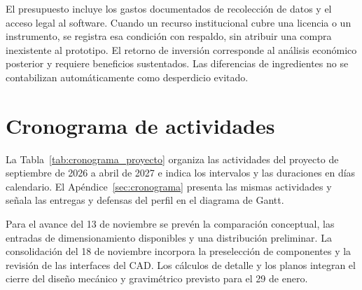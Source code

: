 El presupuesto incluye los gastos documentados de recolección de datos
y el acceso legal al software. Cuando un recurso institucional cubre una
licencia o un instrumento, se registra esa condición con respaldo, sin
atribuir una compra inexistente al prototipo. El retorno de inversión
corresponde al análisis económico posterior y requiere beneficios
sustentados. Las diferencias de ingredientes no se contabilizan
automáticamente como desperdicio evitado.

\section{Cronograma de actividades}
\label{sec:cronograma_actividades}

La Tabla~\ref{tab:cronograma_proyecto} organiza las actividades del
proyecto de septiembre de 2026 a abril de 2027 e indica los intervalos y
las duraciones en días calendario. El Apéndice~\ref{sec:cronograma}
presenta las mismas actividades y señala las entregas y defensas del
perfil en el diagrama de Gantt.

Para el avance del 13 de noviembre se prevén la comparación conceptual,
las entradas de dimensionamiento disponibles y una distribución
preliminar. La consolidación del 18 de noviembre incorpora la
preselección de componentes y la revisión de las interfaces del CAD.
Los cálculos de detalle y los planos integran el cierre del diseño
mecánico y gravimétrico previsto para el 29 de enero.





